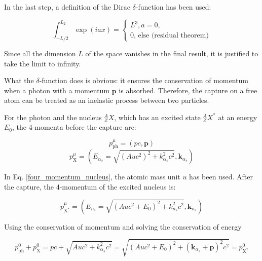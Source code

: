 \documentclass{article}
\begin{document}
In the last step, a definition of the Dirac $\delta$-function has been used:

\begin{equation}
	\int_{-L/2}^{L_2} \exp{ \left( i a x \right) } = 
	\begin{cases}
	L^3, a = 0,\\
	0 \text{, else (residual theorem)}
	\end{cases}
\end{equation}

Since all the dimension $L$ of the space vanishes in the final result, it is justified to take the limit to infinity.

What the $\delta$-function does is obvious: it ensures the conservation of momentum when a photon with a momentum $\mathbf{p}$ is absorbed. 
Therefore, the capture on a free atom can be treated as an inelastic process between two particles. 

For the photon and the nucleus $^A_ZX$, which has an excited state $^A_ZX^*$ at an energy $E_0$, the 4-momenta before the capture are:

\begin{equation}
\label{four_momentum_photon}
	p^\mu_{\mathrm{ph}} = \left( p c, \mathbf{p} \right)
\end{equation}
\begin{equation}
\label{four_momentum_nucleus}
	p^\mu_{\mathrm{X}} = \left( E_{\alpha_s} = \sqrt{ \left(Au c^2\right)^2 + k_{\alpha_s}^2 c^2}, \mathbf{k}_{\alpha_s} \right)
\end{equation}

In Eq. \ref{four_momentum_nucleus}, the atomic mass unit $u$ has been used.
After the capture, the 4-momentum of the excited nucleus is:

\begin{equation}
	\label{four_momentum_excited_nucleus}
	p^\mu_{\mathrm{X^*}} = \left( E_{n_s} = \sqrt{ \left( Au c^2 + E_0 \right)^2 + k_{n_s}^2 c^2}, \mathbf{k}_{n_s} \right)
\end{equation}

Using the conservation of momentum and solving the conservation of energy

\begin{equation}
	\label{conservation_of_energy}
	p^0_\mathrm{ph} + p^0_\mathrm{X} = p c + \sqrt{ Au c^2 + k_{\alpha_s}^2 c^2} = \sqrt{ \left( Au c^2 + E_0 \right)^2 + (\mathbf{k}_{\alpha_s} + \mathbf{p})^2 c^2} = p^0_\mathrm{X^*}
\end{equation}
\end{document}
